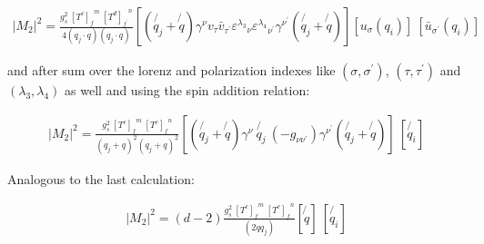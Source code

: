 \begin{equation}
\begin{split}
|M_2|^2 =\frac{g_s^2 \: {[T^c]_f}^m \: {[T^d]_{f^{\prime}}}^n }{4(q_j \cdot q) (q_j \cdot q)} [(\not{q_j} + \not{q}) \gamma^{\nu}  {v}_{\tau}\bar{v}_{{\tau}^{\prime}}{\varepsilon^{\lambda_3}}_{\nu} {\varepsilon^{\lambda_4}}_{{\nu}^{\prime}}  \gamma^{{\nu}^{\prime}}(\not{q_j} + \not{q})]
[{u}_{\sigma}(q_i) ]
\: [\bar{u}_{{\sigma}^{\prime}}(q_i)]
\end{split}
\end{equation}

and after sum over the lorenz and polarization indexes like $({\sigma},{\sigma}^{\prime})$, $({\tau},{\tau}^{\prime})$ and $({\lambda_{3}},{\lambda}_{4})$ as well and using the spin addition relation:
 
%

\begin{equation}
\begin{split}
|M_2|^2 =\frac{g_s^2 \: {[T^c]_f}^m \: {[T^c]_{f}}^n }{(q_j + q)^2 (q_j + q)^2} [(\not{q_j} + \not{q}) \gamma^{\nu}  \:\not{q_j}\: (-g_{{\nu}{{\nu}^{\prime}}}) \gamma^{{\nu}^{\prime}}(\not{q_j} + \not{q})]\: 
[\not{q_i} ]
\end{split}
\end{equation}


Analogous to the last calculation:

\begin{equation}
\begin{split}
|M_2|^2 =(d-2) \frac{g_s^2 \: {[T^c]_f}^m \: {[T^c]_{f}}^n }{(2qq_j)} [\not{q}]\: 
[\not{q_i} ]
\end{split}
\end{equation}
\pagebreak

